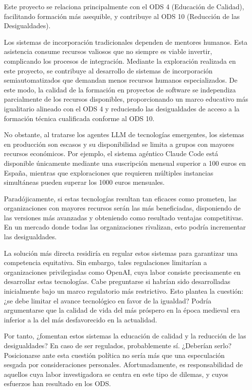 Este proyecto se relaciona principalmente con el ODS 4 (Educación de Calidad), facilitando formación más asequible, y contribuye al ODS 10 (Reducción de las Desigualdades).

Los sistemas de incorporación tradicionales dependen de mentores humanos. Esta asistencia consume recursos valiosos que no siempre es viable invertir, complicando los procesos de integración. Mediante la exploración realizada en este proyecto, se contribuye al desarrollo de sistemas de incorporación semiautomatizados que demandan menos recursos humanos especializados. De este modo, la calidad de la formación en proyectos de software se independiza parcialmente de los recursos disponibles, proporcionando un marco educativo más igualitario alineado con el ODS 4 y reduciendo las desigualdades de acceso a la formación técnica cualificada conforme al ODS 10.

No obstante, al tratarse los agentes LLM de tecnologías emergentes, los sistemas en producción son escasos y su disponibilidad se limita a grupos con mayores recursos económicos. Por ejemplo, el sistema agéntico Claude Code está disponible únicamente mediante una suscripción mensual superior a 100 euros en España, mientras que exploraciones que requieren múltiples instancias simultáneas pueden superar los 1000 euros mensuales.

Paradójicamente, si estas tecnologías resultan tan eficaces como prometen, las organizaciones con mayores recursos serán las más beneficiadas, disponiendo de las versiones más avanzadas y obteniendo como resultado ventajas competitivas. En un mercado donde todas las organizaciones rivalizan, esto podría incrementar las desigualdades.

La solución más directa residiría en regular estos sistemas para garantizar una competencia equitativa. Sin embargo, tales regulaciones limitarían a organizaciones privilegiadas como OpenAI, cuya labor consiste precisamente en desarrollar estas tecnologías. Cabe preguntarse si habrían sido desarrolladas inicialmente bajo un marco regulatorio más restrictivo. Esto plantea la cuestión: ¿se debe limitar el avance tecnológico en favor de la igualdad? Podría argumentarse que la calidad de vida del más próspero en la época medieval era inferior a la del más desfavorecido en la actualidad.

Por tanto, ¿fomentan estos sistemas la educación de calidad y la reducción de las desigualdades? En caso de ser regulados, probablemente sí. ¿Deberían serlo? Posicionarse ante esta cuestión política no sería más que una especulación sesgada por consideraciones personales. Afortunadamente, es responsabilidad de aquellos cuya labor investigadora se centra en este tipo de dilemas, y cuyos esfuerzos han resultado en los ODS.
